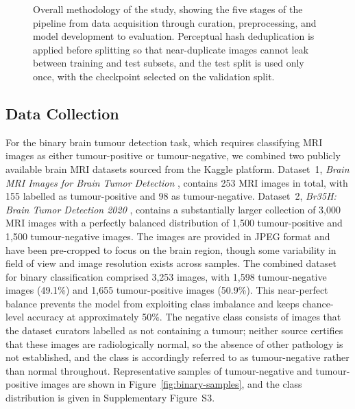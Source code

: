 \documentclass[final,3p,times,number]{elsarticle}
\begin{document}
\begin{figure}[htbp]
\caption{Overall methodology of the study, showing the five stages of the pipeline from data acquisition through curation, preprocessing, and model development to evaluation. Perceptual hash deduplication is applied before splitting so that near-duplicate images cannot leak between training and test subsets, and the test split is used only once, with the checkpoint selected on the validation split.}
\label{fig:methodology}
\end{figure}

\subsection{Data Collection}
\label{sec:data}

For the binary brain tumour detection task, which requires classifying MRI images as either tumour-positive or tumour-negative, we combined two publicly available brain MRI datasets sourced from the Kaggle platform. Dataset~1, \textit{Brain MRI Images for Brain Tumor Detection} \cite{ds1}, contains 253 MRI images in total, with 155 labelled as tumour-positive and 98 as tumour-negative. Dataset~2, \textit{Br35H: Brain Tumor Detection 2020} \cite{ds2}, contains a substantially larger collection of 3,000 MRI images with a perfectly balanced distribution of 1,500 tumour-positive and 1,500 tumour-negative images. The images are provided in JPEG format and have been pre-cropped to focus on the brain region, though some variability in field of view and image resolution exists across samples. The combined dataset for binary classification comprised 3,253 images, with 1,598 tumour-negative images (49.1\%) and 1,655 tumour-positive images (50.9\%). This near-perfect balance prevents the model from exploiting class imbalance and keeps chance-level accuracy at approximately 50\%. The negative class consists of images that the dataset curators labelled as not containing a tumour; neither source certifies that these images are radiologically normal, so the absence of other pathology is not established, and the class is accordingly referred to as tumour-negative rather than normal throughout. Representative samples of tumour-negative and tumour-positive images are shown in Figure~\ref{fig:binary-samples}, and the class distribution is given in Supplementary Figure~S3.
\end{document}
